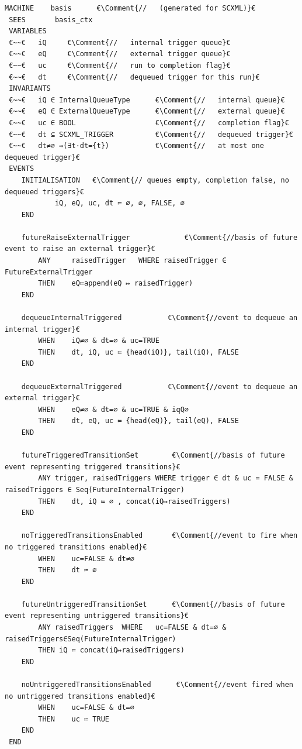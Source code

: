  \begin{lstfloat}[!tb]
 \begin{lstlisting}[caption={Abstract basis machine}, label={lst:BasisMachine},language=Event-B, escapechar=€, frame=single, basicstyle=\rmfamily\scriptsize, belowskip=-2.0 \baselineskip]
 MACHINE	basis	   €\Comment{//   (generated for SCXML)}€
 SEES    	basis_ctx
 VARIABLES
 €~~€	iQ	   €\Comment{//   internal trigger queue}€
 €~~€	eQ	   €\Comment{//   external trigger queue}€
 €~~€	uc	   €\Comment{//   run to completion flag}€
 €~~€	dt	   €\Comment{//   dequeued trigger for this run}€
 INVARIANTS
 €~~€	iQ ∈ InternalQueueType	   	€\Comment{//   internal queue}€
 €~~€	eQ ∈ ExternalQueueType	   	€\Comment{//   external queue}€
 €~~€	uc ∈ BOOL	   				€\Comment{//   completion flag}€
 €~~€	dt ⊆ SCXML_TRIGGER	   		€\Comment{//   dequeued trigger}€
 €~~€	dt≠∅ ⇒(∃t·dt={t})			€\Comment{//   at most one dequeued trigger}€
 EVENTS
 	INITIALISATION   €\Comment{// queues empty, completion false, no dequeued triggers}€
 			iQ, eQ, uc, dt ≔ ∅,	∅, FALSE, ∅  
 	END

 	futureRaiseExternalTrigger      	   €\Comment{//basis of future event to raise an external trigger}€
 		ANY 	raisedTrigger	WHERE raisedTrigger ∈ FutureExternalTrigger
 		THEN	eQ≔append(eQ ↦ raisedTrigger)
 	END

 	dequeueInternalTriggered      	   €\Comment{//event to dequeue an internal trigger}€ 
 		WHEN	iQ≠∅ & dt=∅ & uc=TRUE 
 		THEN	dt, iQ, uc ≔ {head(iQ)}, tail(iQ), FALSE
 	END

 	dequeueExternalTriggered      	   €\Comment{//event to dequeue an external trigger}€ 
 		WHEN	eQ≠∅ & dt=∅ & uc=TRUE & iqQ∅
		THEN	dt, eQ, uc ≔ {head(eQ)}, tail(eQ), FALSE
 	END

 	futureTriggeredTransitionSet      	€\Comment{//basis of future event representing triggered transitions}€
 		ANY trigger, raisedTriggers WHERE trigger ∈ dt & uc = FALSE & raisedTriggers ∈ Seq(FutureInternalTrigger)
 		THEN	dt, iQ ≔ ∅ , concat(iQ↦raisedTriggers)
 	END

 	noTriggeredTransitionsEnabled      	€\Comment{//event to fire when no triggered transitions enabled}€ 
 		WHEN 	uc=FALSE & dt≠∅
 		THEN	dt ≔ ∅
 	END

 	futureUntriggeredTransitionSet      €\Comment{//basis of future event representing untriggered transitions}€
 		ANY	raisedTriggers	WHERE	uc=FALSE & dt=∅ & raisedTriggers∈Seq(FutureInternalTrigger)
 		THEN iQ ≔ concat(iQ↦raisedTriggers)
 	END

 	noUntriggeredTransitionsEnabled      €\Comment{//event fired when no untriggered transitions enabled}€
 		WHEN	uc=FALSE & dt=∅
 		THEN	uc ≔ TRUE
 	END
 END
 \end{lstlisting}
 \end{lstfloat}

